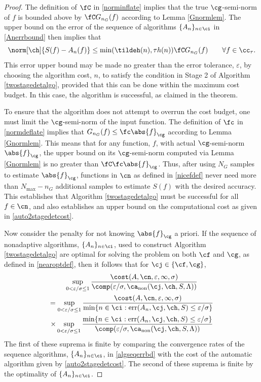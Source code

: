 \documentclass[]{elsarticle}
\DeclareMathOperator{\fix}{non}
\DeclareMathOperator{\err}{err}
\theoremstyle{definition}
\theoremstyle{remark}
\newcommand{\Gnorm}[1]{\abs{#1}_{\cg}}
\begin{document}
\begin{proof} The definition of $\fC$ in \eqref{norminflate} implies that the true $\cg$-semi-norm of $f$ is bounded above by $\fC G_{n_G}(f)$ according to Lemma \ref{Gnormlem}.  The upper bound on the error of the sequence of algorithms $\{A_n\}_{n \in \ci}$ in \eqref{Anerrbound} then implies that 
\[
\norm[\ch]{S(f) -  A_n(f)} \le \min(\tildeh(n),\tau h(n)) \fC G_{n_G}(f) \qquad \forall f \in \cc_{\tau}.
\]
This error upper bound may be made no greater than the error tolerance, $\varepsilon$, by choosing the algorithm cost, $n$, to satisfy the condition in Stage 2 of Algorithm \ref{twostagedetalgo}, provided that this can be done within the maximum cost budget.  In this case, the algorithm is successful, as claimed in the theorem.

To ensure that the algorithm does not attempt to overrun the cost budget, one must limit the $\cg$-semi-norm of the input function.  The definition of  $\fc$ in \eqref{normdeflate} implies that $G_{n_G}(f) \le \fc\Gnorm{f}$ according to Lemma \ref{Gnormlem}. This means that for any function, $f$, with actual $\cg$-semi-norm $\Gnorm{f}$, the upper bound on its $\cg$-semi-norm computed via Lemma \ref{Gnormlem} is no greater than $\fC \fc \Gnorm{f}$.  Thus, after using $N_G$ samples to estimate $\Gnorm{f}$, functions in $\cn$ as defined in \eqref{nicefdef} never need more than $N_{\max} - n_G$ additional samples to estimate $S(f)$ with the desired accuracy.  This establishes that Algorithm \ref{twostagedetalgo} must be successful for all $f \in \cn$, and also establishes an upper bound on the computational cost as given in \eqref{auto2stagedetcost}.

Now consider the penalty for not knowing $\Gnorm{f}$ a priori.  If the sequence of nonadaptive algorithms, $\{A_n\}_{n \in \ci}$, used to construct Algorithm \ref{twostagedetalgo} are optimal for solving the problem on both $\cf$ and $\cg$, as defined in \eqref{nearoptdef}, then it follows that for $\cj \in \{\cf,\cg\}$,
\begin{multline*}
\sup_{0 < \varepsilon/\sigma \le 1} \frac{\cost(A,\cn,\varepsilon,\infty,\sigma)} {\comp(\varepsilon/\sigma,\ca_{\fix}(\cj,\ch,S,\Lambda))} \\
= \sup_{0 < \varepsilon/\sigma \le 1} \frac{\cost(A,\cn,\varepsilon,\infty,\sigma)}{\min\{n \in \ci : \err(A_n,\cj,\ch,S) \le \varepsilon/\sigma\}} \\
 \times \sup_{0 < \varepsilon/\sigma \le 1} \frac{\min\{n \in \ci : \err(A_n,\cj,\ch,S) \le \varepsilon/\sigma\}} {\comp(\varepsilon/\sigma,\ca_{\fix}(\cj,\ch,S,\Lambda))}
\end{multline*} 
The first of these suprema is finite by comparing the convergence rates of the sequence algorithms, $\{A_n\}_{n \in \ci}$, in \eqref{algseqerrbd} with the cost of the automatic algorithm given by \eqref{auto2stagedetcost}. The second of these suprema is finite by the optimality of $\{A_n\}_{n \in \ci}$.  
\end{proof}
\end{document}
